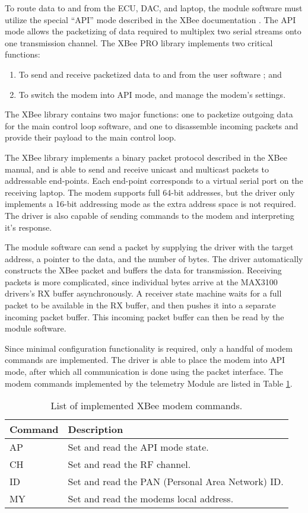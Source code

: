 To route data to and from the ECU, DAC, and laptop, the module software must utilize the special ``API'' mode described in the XBee documentation \cite{XBeeManual}. The API mode allows the packetizing of data required to multiplex two serial streams onto one transmission channel. The XBee PRO library implements two critical functions:

\begin{enumerate}
\item To send and receive packetized data to and from the user software ; and
\item To switch the modem into API mode, and manage the modem's settings.
\end{enumerate}

The XBee library contains two major functions: one to packetize outgoing data for the main control loop software, and one to disassemble incoming packets and provide their payload to the main control loop.

The XBee library implements a binary packet protocol described in the XBee manual, and is able to send and receive unicast and multicast packets to addressable end-points. Each end-point corresponds to a virtual serial port on the receiving laptop. The modem supports full 64-bit addresses, but the driver only implements a 16-bit addressing mode as the extra address space is not required. The driver is also capable of sending commands to the modem and interpreting it's response.

The module software can send a packet by supplying the driver with the target address, a pointer to the data, and the number of bytes. The driver automatically constructs the XBee packet and buffers the data for transmission. Receiving packets is more complicated, since individual bytes arrive at the MAX3100 drivers's RX buffer asynchronously. A receiver state machine waits for a full packet to be available in the RX buffer, and then pushes it into a separate incoming packet buffer. This incoming packet buffer can then be read by the module software.

Since minimal configuration functionality is required, only a handful of modem commands are implemented. The driver is able to place the modem into API mode, after which all communication is done using the packet interface. The modem commands implemented by the telemetry Module are listed in Table \ref{tab:xbee_commands}.

\begin{table}
\caption{List of implemented XBee modem commands.}
\centering{}
\begin{tabular}{|l|l|}
\hline 
Command & Description \tabularnewline
\hline
\hline
AP & Set and read the API mode state. \tabularnewline
\hline
CH & Set and read the RF channel. \tabularnewline
\hline 
ID & Set and read the PAN (Personal Area Network) ID. \tabularnewline
\hline
MY & Set and read the modems local address. \tabularnewline
\hline
\end{tabular}
\label{tab:xbee_commands}
\end{table}

